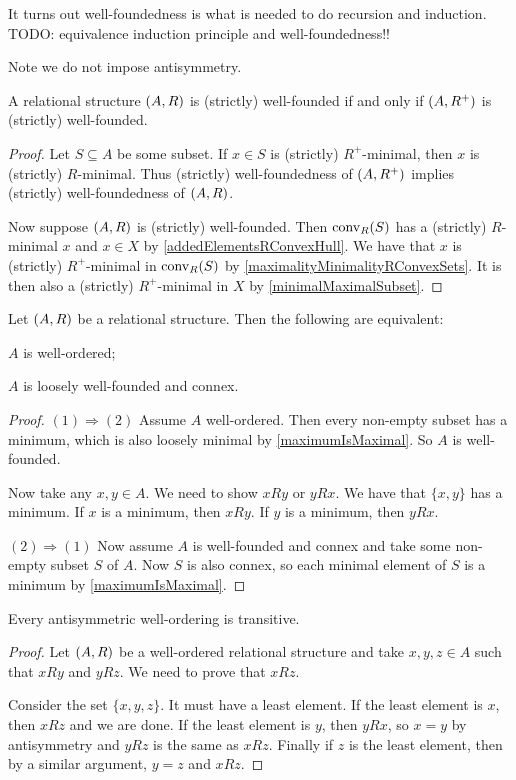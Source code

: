 It turns out well-foundedness is what is needed to do recursion and induction. TODO: equivalence induction principle and well-foundedness!!

Note we do not impose antisymmetry.

\begin{proposition}
A relational structure $\sSet{A,R}$ is (strictly) well-founded \textup{if and only if} $\sSet{A,R^+}$ is (strictly) well-founded.
\end{proposition}
\begin{proof}
Let $S \subseteq A$ be some subset. If $x\in S$ is (strictly) $R^+$-minimal, then $x$ is (strictly) $R$-minimal. Thus (strictly) well-foundedness of $\sSet{A,R^+}$ implies (strictly) well-foundedness of $\sSet{A,R}$.

Now suppose $\sSet{A,R}$ is (strictly) well-founded. Then $\operatorname{conv}_R(S)$ has a (strictly) $R$-minimal $x$ and $x\in X$ by \ref{addedElementsRConvexHull}. We have that $x$ is (strictly) $R^+$-minimal in $\operatorname{conv}_R(S)$ by \ref{maximalityMinimalityRConvexSets}. It is then also a (strictly) $R^+$-minimal in $X$ by \ref{minimalMaximalSubset}.
\end{proof}

\begin{proposition} \label{wellOrderedCondition}
Let $\sSet{A,R}$ be a relational structure. Then the following are equivalent:
\item $A$ is well-ordered;
\item $A$ is loosely well-founded and connex.
\end{proposition}
\begin{proof}
$(1) \Rightarrow (2)$ Assume $A$ well-ordered. Then every non-empty subset has a minimum, which is also loosely minimal by \ref{maximumIsMaximal}. So $A$ is well-founded.

Now take any $x,y\in A$. We need to show $xRy$ or $yRx$. We have that $\{x,y\}$ has a minimum. If $x$ is a minimum, then $xRy$. If $y$ is a minimum, then $yRx$.

$(2) \Rightarrow (1)$ Now assume $A$ is well-founded and connex and take some non-empty subset $S$ of $A$. Now $S$ is also connex, so each minimal element of $S$ is a minimum by \ref{maximumIsMaximal}.
\end{proof}

\begin{proposition}
Every antisymmetric well-ordering is transitive.
\end{proposition}
\begin{proof}
Let $\sSet{A,R}$ be a well-ordered relational structure and take $x,y,z\in A$ such that $xRy$ and $yRz$. We need to prove that $xRz$.

Consider the set $\{x,y,z\}$. It must have a least element. If the least element is $x$, then $xRz$ and we are done. If the least element is $y$, then $yRx$, so $x=y$ by antisymmetry and $yRz$ is the same as $xRz$. Finally if $z$ is the least element, then by a similar argument, $y=z$ and $xRz$.
\end{proof}

